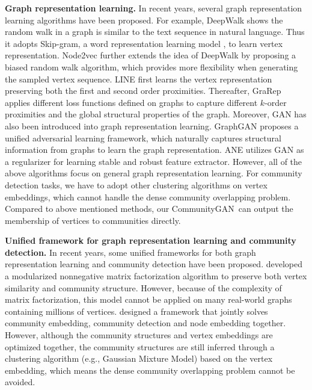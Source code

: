 \documentclass[sigconf]{acmart}
\newcommand{\ComGAN}{CommunityGAN}
\begin{document}
\vspace{5pt}\noindent \textbf{Graph representation learning.}
In recent years, several graph representation learning algorithms have been proposed.
For example, DeepWalk \cite{deepwalk} shows the random walk in a graph is similar to the text sequence in natural language. Thus it adopts Skip-gram, a word representation learning model \cite{word2vec}, to learn vertex representation.
Node2vec \cite{node2vec} further extends the idea of DeepWalk by proposing a biased random walk algorithm, which provides more flexibility when generating the sampled vertex sequence.
LINE \cite{LINE} first learns the vertex representation preserving both the first and second order proximities.
Thereafter, GraRep \cite{GraRep} applies different loss functions defined on graphs to capture different $k$-order proximities and the global structural properties of the graph.
Moreover, GAN has also been introduced into graph representation learning.
GraphGAN \cite{GraphGAN} proposes a unified adversarial learning framework, which naturally captures structural information from graphs to learn the graph representation.
ANE \cite{ANE} utilizes GAN as a regularizer for learning stable and robust feature extractor.
However, all of the above algorithms focus on general graph representation learning.
For community detection tasks, we have to adopt other clustering algorithms on vertex embeddings, which cannot handle the dense community overlapping problem.
Compared to above mentioned methods, our \ComGAN~can output the membership of vertices to communities directly.

\vspace{5pt}\noindent \textbf{Unified framework for graph representation learning and community detection.}
In recent years, some unified frameworks for both graph representation learning and community detection have been proposed.
\citet{M-NMF} developed a modularized nonnegative matrix factorization algorithm to preserve both vertex similarity and community structure.
However, because of the complexity of matrix factorization, this model cannot be applied on many real-world graphs containing millions of vertices.
\citet{ComE} designed a framework that jointly solves community embedding, community detection and node embedding together.
However, although the community structures and vertex embeddings are optimized together, the community structures are still inferred through a clustering algorithm (e.g., Gaussian Mixture Model) based on the vertex embedding, which means the dense community overlapping problem cannot be avoided.
\end{document}
